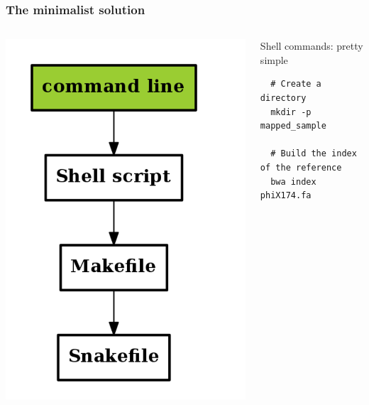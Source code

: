 \documentclass{beamer}
\begin{document}
 \begin{frame}
  \frametitle{The minimalist solution}

 \begin{columns}
 \begin{column}[T]{3cm}
 \includegraphics[width=1\textwidth, height=0.6\textheight]{images/flow_methods_1.png}
 \end{column}
  \begin{column}[T]{9cm}
  \begin{block}{Shell commands: pretty simple}
  \begin{lstlisting}
  # Create a directory
  mkdir -p mapped_sample
  
  # Build the index of the reference
  bwa index phiX174.fa
  

\end{lstlisting}
\end{block}
\end{column}
\end{columns}
\end{frame}
\end{document}
